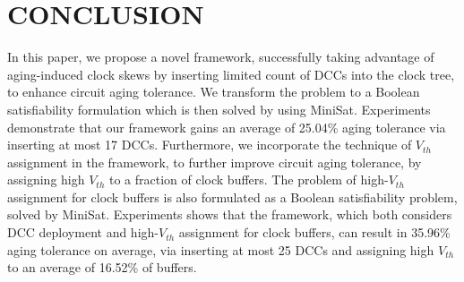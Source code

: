 \section{CONCLUSION}
\label{sec:conclude}
In this paper, we propose a novel framework, successfully taking advantage of aging-induced clock skews by inserting limited count of DCCs into the clock tree, to enhance circuit aging tolerance. We transform the problem to a Boolean satisfiability formulation which is then solved by using MiniSat. Experiments demonstrate that our framework gains an average of 25.04\% aging tolerance via inserting at most 17 DCCs. Furthermore, we incorporate the technique of $V_{th}$ assignment in the framework, to further improve circuit aging tolerance, by assigning high $V_{th}$ to a fraction of clock buffers. The problem of high-$V_{th}$ assignment for clock buffers is also formulated as a Boolean satisfiability problem, solved by MiniSat. Experiments shows that the framework, which both considers DCC deployment and high-$V_{th}$ assignment for clock buffers, can result in 35.96\% aging tolerance on average, via inserting at most 25 DCCs and assigning high $V_{th}$ to an average of 16.52\% of buffers.


